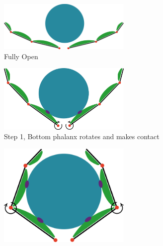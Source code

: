 \begin{figure}

    \centering
    \begin{subfigure}{.3\linewidth}
        \centering
    \includegraphics[width=0.7\textwidth]{Images/Underactuaction/FullyOpen.png}
        \caption{Fully Open}
        \label{fig:UAFullyOpen}
    \end{subfigure}
    \begin{subfigure}{.3\linewidth}
        \centering
        \includegraphics[width=0.7\textwidth]{Images/Underactuaction/phase1png.png}
        \caption{Step 1, Bottom phalanx rotates and makes contact}
        \label{fig:UAStep1}
    \end{subfigure}
    \begin{subfigure}{.3\linewidth}
        \centering
    \includegraphics[width=0.7\textwidth]{Images/Underactuaction/phase2.png}

\end{subfigure}
\end{figure}
